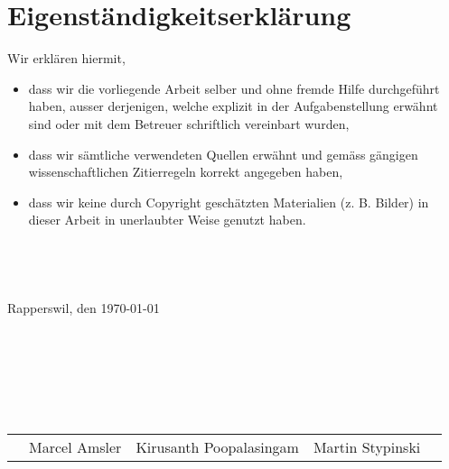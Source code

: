 \chapter*{Eigenständigkeitserklärung}

Wir erklären hiermit,
\begin{itemize}
	\item{dass wir die vorliegende Arbeit selber und ohne fremde Hilfe durchgeführt haben, ausser
derjenigen, welche explizit in der Aufgabenstellung erwähnt sind oder mit dem Betreuer
schriftlich vereinbart wurden,}
	\item{dass wir sämtliche verwendeten Quellen erwähnt und gemäss gängigen wissenschaftlichen
Zitierregeln korrekt angegeben haben,}
	\item{dass wir keine durch Copyright geschätzten Materialien (z. B. Bilder) in dieser Arbeit in
unerlaubter Weise genutzt haben.}
\end{itemize}
\begin{verbatim}




\end{verbatim}
Rapperswil, den \today
\begin{verbatim}







\end{verbatim}
\begin{tabular*}{\textwidth}{p{0cm}>{\centering\arraybackslash}m{4.8cm}>{\centering\arraybackslash}m{4.8cm}>{\centering\arraybackslash}m{4.8cm}p{0cm}}
	& Marcel Amsler & Kirusanth Poopalasingam & Martin Stypinski & \\
\end{tabular*}